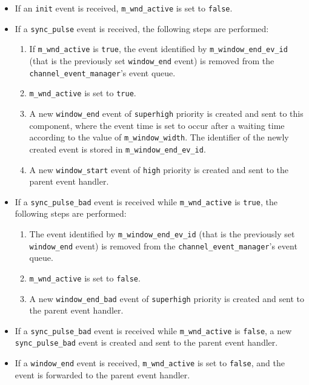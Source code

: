\begin{itemize}

\item If an \texttt{init} event is received, \texttt{m\_wnd\_active} is set to \texttt{false}.

\item If a \texttt{sync\_pulse} event is received, the following steps are performed:

\begin{enumerate}

\item If \texttt{m\_wnd\_active} is \texttt{true}, the event identified by \texttt{m\_window\_end\_ev\_id} (that is the previously set \texttt{window\_end} event) is removed from the \texttt{channel\_event\_manager}'s event queue.

\item \texttt{m\_wnd\_active} is set to \texttt{true}.

\item A new \texttt{window\_end} event of \texttt{superhigh} priority is created and sent to this component, where the event time is set to occur after a waiting time according to the value of \texttt{m\_window\_width}. The identifier of the newly created event is stored in \texttt{m\_window\_end\_ev\_id}.

\item A new \texttt{window\_start} event of \texttt{high} priority is created and sent to the parent event handler.

\end{enumerate}

\item If a \texttt{sync\_pulse\_bad} event is received while \texttt{m\_wnd\_active} is \texttt{true}, the following steps are performed:

\begin{enumerate}

\item The event identified by \texttt{m\_window\_end\_ev\_id} (that is the previously set \texttt{window\_end} event) is removed from the \texttt{channel\_event\_manager}'s event queue.

\item \texttt{m\_wnd\_active} is set to \texttt{false}.

\item A new \texttt{window\_end\_bad} event of \texttt{superhigh} priority is created and sent to the parent event handler.

\end{enumerate}

\item If a \texttt{sync\_pulse\_bad} event is received while \texttt{m\_wnd\_active} is \texttt{false}, a new \texttt{sync\_pulse\_bad} event is created and sent to the parent event handler.

\item If a \texttt{window\_end} event is received, \texttt{m\_wnd\_active} is set to \texttt{false}, and the event is forwarded to the parent event handler.

\end{itemize}

